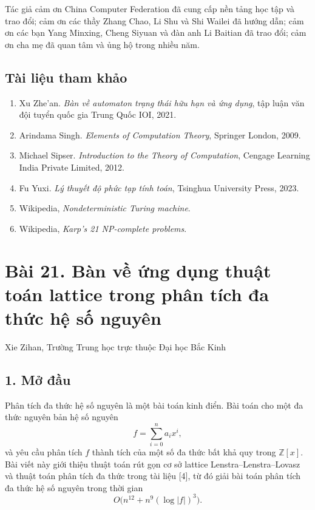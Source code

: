 \documentclass[11pt]{article}
\begin{document}
Tác giả cảm ơn China Computer Federation đã cung cấp nền tảng học tập và trao
đổi; cảm ơn các thầy Zhang Chao, Li Shu và Shi Wailei đã hướng dẫn; cảm ơn các
bạn Yang Minxing, Cheng Siyuan và đàn anh Li Baitian đã trao đổi; cảm ơn cha mẹ
đã quan tâm và ủng hộ trong nhiều năm.

\subsection*{Tài liệu tham khảo}

\begin{enumerate}
\item Xu Zhe'an. \emph{Bàn về automaton trạng thái hữu hạn và ứng dụng}, tập
luận văn đội tuyển quốc gia Trung Quốc IOI, 2021.
\item Arindama Singh. \emph{Elements of Computation Theory}, Springer London,
2009.
\item Michael Sipser. \emph{Introduction to the Theory of Computation}, Cengage
Learning India Private Limited, 2012.
\item Fu Yuxi. \emph{Lý thuyết độ phức tạp tính toán}, Tsinghua University
Press, 2023.
\item Wikipedia, \emph{Nondeterministic Turing machine}.
\item Wikipedia, \emph{Karp's 21 NP-complete problems}.
\end{enumerate}

\section*{Bài 21. Bàn về ứng dụng thuật toán lattice trong phân tích đa thức hệ số nguyên}

\begin{center}
Xie Zihan, Trường Trung học trực thuộc Đại học Bắc Kinh
\end{center}

\subsection*{1. Mở đầu}

Phân tích đa thức hệ số nguyên là một bài toán kinh điển. Bài toán cho một đa
thức nguyên bản hệ số nguyên
\[
  f=\sum_{i=0}^{n}a_ix^i,
\]
và yêu cầu phân tích \(f\) thành tích của một số đa thức bất khả quy trong
\(\mathbb Z[x]\). Bài viết này giới thiệu thuật toán rút gọn cơ sở lattice
Lenstra--Lenstra--Lovasz và thuật toán phân tích đa thức trong tài liệu [4],
từ đó giải bài toán phân tích đa thức hệ số nguyên trong thời gian
\[
  O\bigl(n^{12}+n^9(\log |f|)^3\bigr).
\]
\end{document}
